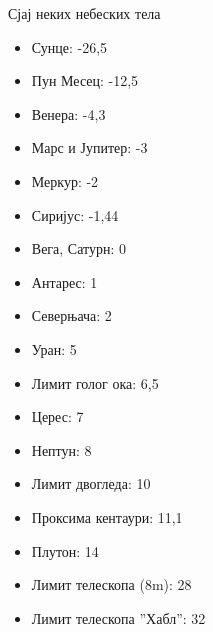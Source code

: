 \documentclass[aspectratio=169, xcolor=table, 10pt]{beamer}
\theoremstyle{definition}
\begin{document}
\begin{frame}{Сјај неких небеских тела}
    \begin{multicols}{2}
    \begin{itemize}
      \item Сунце: -26,5
      \item Пун Месец: -12,5
      \item Венера: -4,3
      \item Марс и Јупитер: -3
      \item Меркур: -2
      \item Сиријус: -1,44
      \item Вега, Сатурн: 0
      \item Антарес: 1
      \item Северњача: 2
      \item Уран: 5
      \item Лимит голог ока: 6,5
      \item Церес: 7
      \item Нептун: 8
      \item Лимит двогледа: 10
      \item Проксима кентаури: 11,1
      \item Плутон: 14
      \item Лимит телескопа (8m): 28
      \item Лимит телескопа ”Хабл”: 32
    \end{itemize}
  \end{multicols}

\end{frame}
\end{document}
